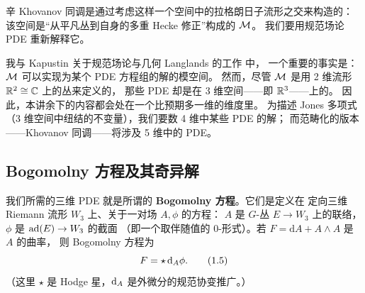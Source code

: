 
辛 Khovanov 同调是通过考虑这样一个空间中的拉格朗日子流形之交来构造的：
该空间是“从平凡丛到自身的多重 Hecke 修正”构成的 $\mathcal{M}$。
我们要用规范场论 PDE 重新解释它。

我与 Kapustin 关于规范场论与几何 Langlands 的工作 \cite{KW} 中，
一个重要的事实是：$\mathcal{M}$ 可以实现为某个 PDE 方程组的解的模空间。
然而，尽管 $\mathcal{M}$ 是用 2 维流形 $\mathbb{R}^2\cong\mathbb{C}$ 上的丛来定义的，
那些 PDE 却是在 3 维空间——即 $\mathbb{R}^3$——上的。
因此，本讲余下的内容都会处在一个比预期多一维的维度里。
为描述 Jones 多项式（3 维空间中纽结的不变量），我们要数 4 维中某些 PDE 的解；
而范畴化的版本——Khovanov 同调——将涉及 5 维中的 PDE。



\subsection{Bogomolny 方程及其奇异解}

我们所需的三维 PDE 就是所谓的 \textbf{Bogomolny 方程}。它们是定义在
定向三维 Riemann 流形 $W_3$ 上、关于一对场 $A,\phi$ 的方程：
$A$ 是 $G$-丛 $E\to W_3$ 上的联络，$\phi$ 是 $\mathrm{ad}(E)\to W_3$ 的截面
（即一个取伴随值的 $0$-形式）。若 $F=\mathrm{d}A+A\wedge A$ 是 $A$ 的曲率，
则 Bogomolny 方程为
\begin{equation}\stepcounter{equation}
  F=\star\,\dA\phi .
  \tag{1.5}\label{eq:1.5}
\end{equation}
（这里 $\star$ 是 Hodge 星，$\mathrm{d}_A$ 是外微分的规范协变推广。）


